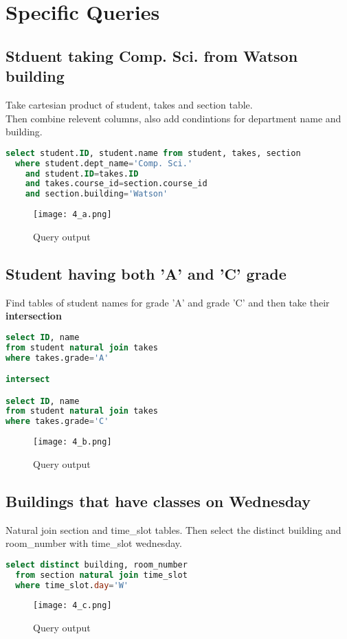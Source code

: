 \documentclass{article}
\begin{document}
\newpage
\section{Specific Queries}
\subsection{Stduent taking Comp. Sci. from Watson building}
Take cartesian product of student, takes and section table. \\
Then combine relevent columns, also add condintions for department name and building.
\begin{lstlisting}[language=sql]
  select student.ID, student.name from student, takes, section 
  where student.dept_name='Comp. Sci.' 
    and student.ID=takes.ID 
    and takes.course_id=section.course_id 
    and section.building='Watson'
\end{lstlisting}
\begin{figure}[!ht]
  \begin{center}
  \texttt{[image: 4\_a.png]}
  \caption{Query output}
  \end{center}
\end{figure}
\newpage
\subsection{Student having both 'A' and 'C' grade}
Find tables of student names for grade 'A' and grade 'C' and then take their \textbf{intersection}
\begin{lstlisting}[language=sql]
select ID, name 
from student natural join takes 
where takes.grade='A'

intersect

select ID, name 
from student natural join takes 
where takes.grade='C'
\end{lstlisting}
\begin{figure}[!ht]
  \begin{center}
  \texttt{[image: 4\_b.png]}
  \caption{Query output}
  \end{center}
\end{figure}
\subsection{Buildings that have classes on Wednesday}
Natural join section and time\_slot tables. Then select the distinct building and room\_number with time\_slot wednesday.
\begin{lstlisting}[language=sql]
  select distinct building, room_number
  from section natural join time_slot
  where time_slot.day='W'
\end{lstlisting}
\begin{figure}[!ht]
  \begin{center}
  \texttt{[image: 4\_c.png]}
  \caption{Query output}
  \end{center}
\end{figure}
\end{document}
